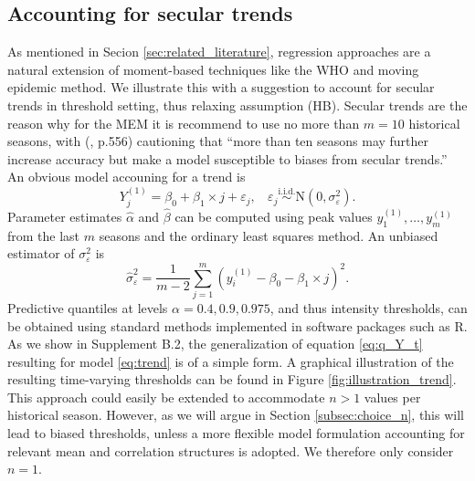 \documentclass[12pt]{article}
\begin{document}
\subsection{Accounting for secular trends}
\label{subsec:regression}
\label{subsec:trends}

As mentioned in Secion \ref{sec:related_literature}, regression approaches are a natural extension of moment-based techniques like the WHO and moving epidemic method. We illustrate this with a suggestion to account for secular trends in threshold setting, thus relaxing assumption (HB). Secular trends are the reason why for the MEM it is recommend to use no more than $m = 10$ historical seasons, with \citeauthor{Vega2013} (\citeyear{Vega2013}, p.556) cautioning that ``more than ten seasons may further increase accuracy but make a model susceptible to biases from secular trends.'' An obvious model accouning for a trend is
\begin{equation}
Y_j^{(1)} = \beta_0 + \beta_1 \times j + \varepsilon_j, \ \ \ \ \varepsilon_j \stackrel{\text{i.i.d.}}{\sim} \text{N}(0, \sigma^2_\varepsilon).\label{eq:trend}
\end{equation}
Parameter estimates $\hat{\alpha}$ and $\hat{\beta}$ can be computed using peak values $y_1^{(1)}, \dots, y_m^{(1)}$ from the last $m$ seasons and the ordinary least squares method. An unbiased estimator of ${\sigma}^2_\varepsilon$ is
$$
\hat{\sigma}^2_\varepsilon = \frac{1}{m - 2} \sum_{j = 1}^m (y^{(1)}_i - \beta_0 - \beta_1 \times j)^2.
$$
Predictive quantiles at levels $\alpha = 0.4, 0.9, 0.975$, and thus intensity thresholds, can be obtained using standard methods implemented in software packages such as R. As we show in Supplement B.2, the generalization of equation \eqref{eq:q_Y_t} resulting for model \eqref{eq:trend} is of a simple form. A graphical illustration of the resulting time-varying thresholds can be found in Figure \ref{fig:illustration_trend}. This approach could easily be extended to accommodate $n > 1$ values per historical season. However, as we will argue in Section \ref{subsec:choice_n}, this will lead to biased thresholds, unless a more flexible model formulation accounting for relevant mean and correlation structures is adopted. We therefore only consider $n = 1$.
\end{document}
